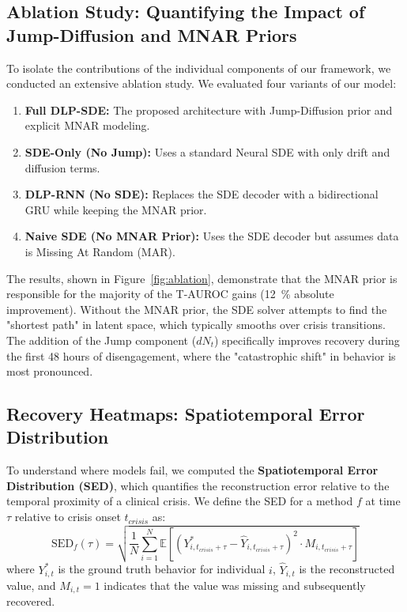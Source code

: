 \subsection{Ablation Study: Quantifying the Impact of Jump-Diffusion and MNAR Priors}
To isolate the contributions of the individual components of our framework, we conducted an extensive ablation study. We evaluated four variants of our model:
\begin{enumerate}
    \item \textbf{Full DLP-SDE:} The proposed architecture with Jump-Diffusion prior and explicit MNAR modeling.
    \item \textbf{SDE-Only (No Jump):} Uses a standard Neural SDE with only drift and diffusion terms.
    \item \textbf{DLP-RNN (No SDE):} Replaces the SDE decoder with a bidirectional GRU while keeping the MNAR prior.
    \item \textbf{Naive SDE (No MNAR Prior):} Uses the SDE decoder but assumes data is Missing At Random (MAR).
\end{enumerate}

The results, shown in Figure~\ref{fig:ablation}, demonstrate that the MNAR prior is responsible for the majority of the T-AUROC gains (\SI{12}{\percent} absolute improvement). Without the MNAR prior, the SDE solver attempts to find the "shortest path" in latent space, which typically smooths over crisis transitions. The addition of the Jump component ($dN_t$) specifically improves recovery during the first 48 hours of disengagement, where the "catastrophic shift" in behavior is most pronounced.

\subsection{Recovery Heatmaps: Spatiotemporal Error Distribution}
To understand where models fail, we computed the \textbf{Spatiotemporal Error Distribution (SED)}, which quantifies the reconstruction error relative to the temporal proximity of a clinical crisis. We define the SED for a method $f$ at time $\tau$ relative to crisis onset $t_{crisis}$ as:
\begin{equation}
    \text{SED}_f(\tau) = \sqrt{\frac{1}{N} \sum_{i=1}^N \mathbb{E} [ (Y_{i, t_{crisis}+\tau}^* - \hat{Y}_{i, t_{crisis}+\tau})^2 \cdot M_{i, t_{crisis}+\tau} ]}
\end{equation}
where $Y_{i, t}^*$ is the ground truth behavior for individual $i$, $\hat{Y}_{i, t}$ is the reconstructed value, and $M_{i, t}=1$ indicates that the value was missing and subsequently recovered.

